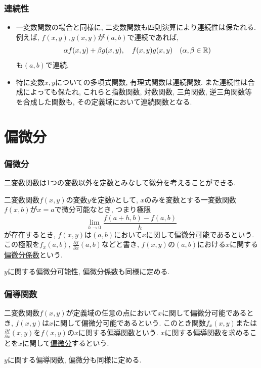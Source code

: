 \begin{frame}
\frametitle{連続性}

\begin{itemize}
\item 一変数関数の場合と同様に, 二変数関数も四則演算により連続性は保たれる. 
例えば, $f(x,y),g(x,y)$が$(a,b)$で連続であれば, 
$$
\alpha f(x,y)+\beta g(x,y), \ \ \ f(x,y)g(x,y) \ \ \ (\alpha,\beta \in \R)
$$
も$(a,b)$で連続. 
\item 特に変数$x,y$についての多項式関数, 有理式関数は連続関数.  
また連続性は合成によっても保たれ, これらと指数関数, 対数関数, 三角関数, 逆三角関数等を合成した関数も, その定義域において連続関数となる.　 
\end{itemize}

\end{frame}





\section{偏微分}


\begin{frame}
\frametitle{偏微分}

二変数関数は1つの変数以外を定数とみなして微分を考えることができる. 

\begin{Def}
二変数関数$f(x,y)$の変数$y$を定数$b$として, $x$のみを変数とする一変数関数$f(x,b)$が$x=a$で微分可能なとき, つまり極限
$$
\lim_{h \to 0} \frac{f(a+h,b)-f(a,b)}{h}
$$
が存在するとき, $f(x,y)$は$(a,b)$において$x$に関して\underline{偏微分可能}であるという. 
この極限を$f_x(a,b)$, $\frac{\partial f}{\partial x}(a,b)$などと書き, 
$f(x,y)$の$(a,b)$における$x$に関する\underline{偏微分係数}という. 
\end{Def}
$y$に関する偏微分可能性, 偏微分係数も同様に定める. 

\end{frame}





\begin{frame}
\frametitle{偏導関数}

\begin{Def}
二変数関数$f(x,y)$が定義域の任意の点において$x$に関して偏微分可能であるとき, $f(x,y)$は$x$に関して偏微分可能であるという. 
このとき関数$f_x(x,y)$または$\frac{\partial f}{\partial x}(x,y)$を$f(x,y)$の$x$に関する\underline{偏導関数}という. 
$x$に関する偏導関数を求めることを$x$に関して\underline{偏微分}するという. 
\end{Def}
$y$に関する偏導関数, 偏微分も同様に定める. 


\end{frame}


